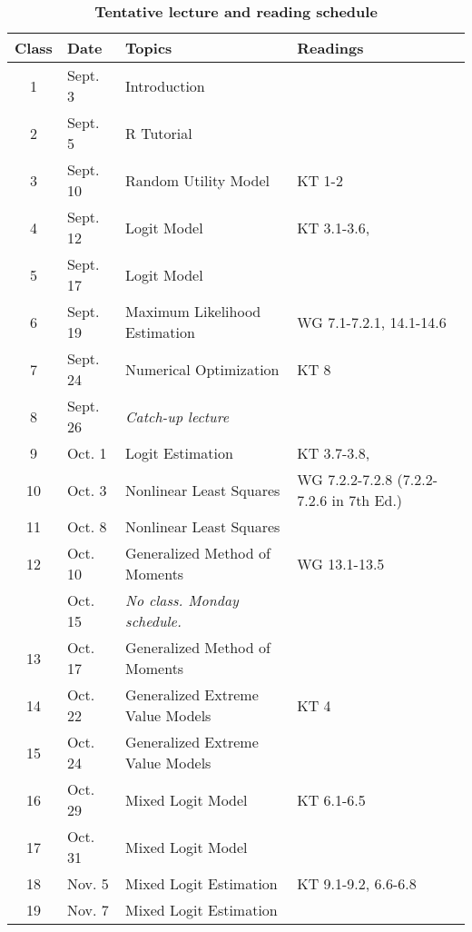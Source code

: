 \documentclass[11pt,letterpaper]{article}
\begin{document}
\begin{NoHyper}
\begin{table}[!ht]
	\centering
	\begin{threeparttable}
		\caption*{\textbf{Tentative lecture and reading schedule}}
   		\begin{tabular}{@{\extracolsep{0.35cm}} c l l l @{}}
    		\toprule
		    \textbf{Class} & \textbf{Date} & \textbf{Topics} & \textbf{Readings}\tnote{1} \\ \toprule
    		1 & Sept. 3 & Introduction & \\
    		2 & Sept. 5 & R Tutorial & \textcite{reiss_structural_2007}\\
    		3 & Sept. 10 & Random Utility Model & KT 1-2\\
    		4 & Sept. 12 & Logit Model & KT 3.1-3.6, \textcite{gruber_tax_1994} \\
    		5 & Sept. 17 & Logit Model & \textcite{adamowicz_combining_1994} \\
    		6 & Sept. 19 & Maximum Likelihood Estimation & WG 7.1-7.2.1, 14.1-14.6 \\
    		7 & Sept. 24 & Numerical Optimization & KT 8 \\
        8 & Sept. 26 & \emph{Catch-up lecture} & \\
    		9 & Oct. 1 & Logit Estimation & KT 3.7-3.8, \textcite{bayer_migration_2009} \\
    		10 & Oct. 3 & Nonlinear Least Squares & WG 7.2.2-7.2.8 (7.2.2-7.2.6 in 7th Ed.) \\
    		11 & Oct. 8 & Nonlinear Least Squares & \textcite{schaefer_dependence_1998} \\
    		12 & Oct. 10 & Generalized Method of Moments & WG 13.1-13.5 \\
        & Oct. 15 & \emph{No class. Monday schedule.} & \\        
    		13 & Oct. 17 & Generalized Method of Moments & \textcite{crawford_welfare_2012} \\
    		14 & Oct. 22 & Generalized Extreme Value Models & KT 4 \\
    		15 & Oct. 24 & Generalized Extreme Value Models & \textcite{train_demand_1987} \\
    		16 & Oct. 29 & Mixed Logit Model & KT 6.1-6.5 \\
    		17 & Oct. 31 & Mixed Logit Model & \textcite{revelt_mixed_1998} \\
    		18 & Nov. 5 & Mixed Logit Estimation & KT 9.1-9.2, 6.6-6.8 \\
    		19 & Nov. 7 & Mixed Logit Estimation & \textcite{handel_adverse_2013} \\

\end{tabular}
\end{threeparttable}
\end{table}
\end{NoHyper}
\end{document}
